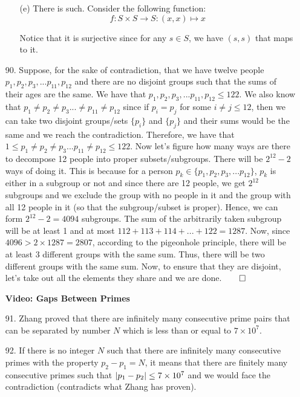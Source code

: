 \documentclass[12pt, a4paper]{article}
\DeclarePairedDelimiter\abs{\lvert}{\rvert}
\newcommand{\rarr}{\rightarrow}
\begin{document}
\begin{itemize}
\begin{itemize}
\item[]

\item[(e)]
There is such. Consider the following function:
$$f : S \times S \rarr S : (x, x) \mapsto x$$

Notice that it is surjective since for any $s \in S$, we have
$(s, s)$ that maps to it.
\end{itemize}

\item[90.]
Suppose, for the sake of contradiction, that we have twelve people $p_1, p_2, p_3, ... p_{11}, p_{12}$ and
there are no disjoint groups such that the sums of their ages are the same. 
We have that $p_1, p_2, p_3, ... p_{11}, p_{12} \leq 122$. We also know that
$p_1 \neq p_2 \neq p_3 ... \neq p_{11} \neq p_{12}$ since if $p_i = p_j$ for some $i \neq j \leq 12$,
then we can take two disjoint groups/sets $\{p_i\}$ and $\{p_j\}$ and their sums would be the same and we reach the contradiction.
Therefore, we have that $1 \leq p_1 \neq p_2 \neq p_3 ... p_{11} \neq p_{12} \leq 122$. Now let's figure
how many ways are there to decompose 12 people into proper subsets/subgroups. There will be $2^{12} - 2$ ways of doing it.
This is because for a person $p_k \in \{p_1, p_2, p_3, ... p_12\}$, $p_k$ is either in a subgroup or not and since there are 12 people,
we get $2^{12}$ subgroups and we exclude the group with no people in it and the group with all 12 people in it (so that the subgroup/subset is proper).
Hence, we can form $2^{12} - 2 = 4094$ subgroups. The sum of the arbitrarily taken subgroup will be at least 1 and at most $112 + 113 + 114 + ... + 122 = 1287$.
Now, since $4096 > 2 \times 1287 = 2807$, according to the pigeonhole principle, there will be at least 3 different groups with the same sum. Thus, there will be
two different groups with the same sum. Now, to ensure that they are disjoint, let's take out all the elements they share and we are done.$\qed$


\item[]
\item[]

{\Large \textbf{Video: Gaps Between Primes}}

\item[91.]
Zhang proved that there are infinitely many consecutive prime pairs that can be separated by number $N$ which is less than or equal to $7 \times 10^7$.

\item[92.]
If there is no integer $N$ such that there are infinitely many consecutive primes with the property $p_2 - p_1 = N$,
it means that there are finitely many consecutive primes such that $\abs{p_1 - p_2} \leq 7 \times 10^7$ and
we would face the contradiction (contradicts what Zhang has proven).


\end{itemize}
\end{document}
